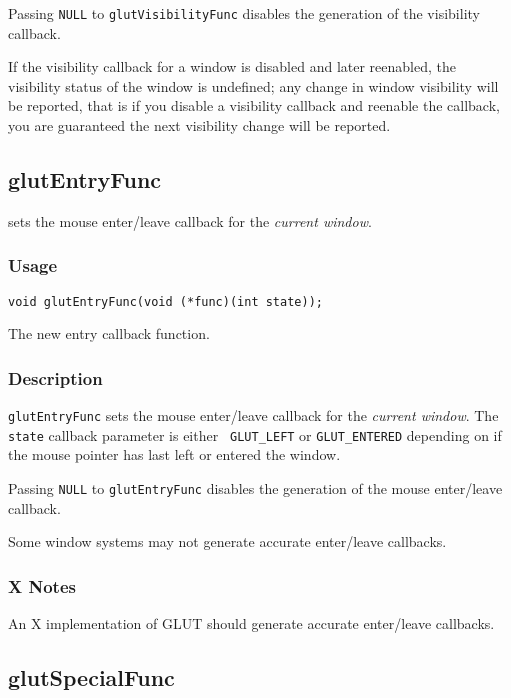 Passing {\tt NULL} to {\tt glutVisibilityFunc}
disables the generation of the visibility callback.

If the visibility callback for a window is
disabled and later reenabled, the visibility status of the window is
undefined; any change in window visibility will be reported, that is
if you disable a visibility callback and reenable the callback, you
are guaranteed the next visibility change will be reported.

\subsection{glutEntryFunc}

 sets the mouse enter/leave callback for the {\em
current window}.

\subsubsection*{Usage}
\begin{verbatim}
void glutEntryFunc(void (*func)(int state));
\end{verbatim}
\begin{description}
\itemsep 0in
\item[\tt func]
The new entry callback function.
\end{description}

\subsubsection*{Description}

{\tt glutEntryFunc} sets the mouse enter/leave callback for the {\em
current window}.  The {\tt state} callback parameter is either {\tt
GLUT\_LEFT} or {\tt GLUT\_ENTERED} depending on if the mouse pointer
has last left or entered the window.

Passing {\tt NULL} to {\tt glutEntryFunc}
disables the generation of the mouse enter/leave callback.

Some window systems may not generate accurate enter/leave callbacks.

\subsubsection*{X Notes}

An X implementation of GLUT should generate accurate enter/leave callbacks.

\subsection{glutSpecialFunc}

